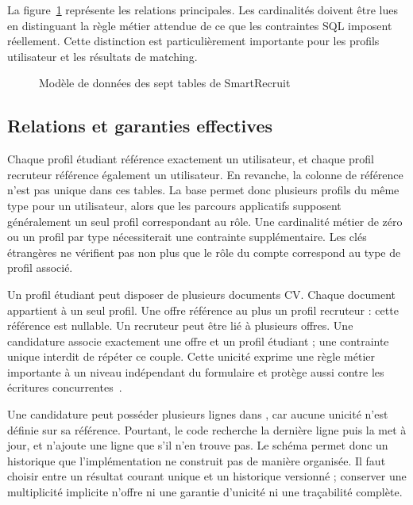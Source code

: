 La figure~\ref{fig:donnees-conception} représente les relations principales. Les cardinalités doivent être lues en distinguant la règle métier attendue de ce que les contraintes SQL imposent réellement. Cette distinction est particulièrement importante pour les profils utilisateur et les résultats de matching.

\begin{figure}[htbp]
\centering

\caption{Modèle de données des sept tables de SmartRecruit}
\label{fig:donnees-conception}
\end{figure}

\subsection{Relations et garanties effectives}

Chaque profil étudiant référence exactement un utilisateur, et chaque profil recruteur référence également un utilisateur. En revanche, la colonne de référence n'est pas unique dans ces tables. La base permet donc plusieurs profils du même type pour un utilisateur, alors que les parcours applicatifs supposent généralement un seul profil correspondant au rôle. Une cardinalité métier de zéro ou un profil par type nécessiterait une contrainte supplémentaire. Les clés étrangères ne vérifient pas non plus que le rôle du compte correspond au type de profil associé.

Un profil étudiant peut disposer de plusieurs documents CV. Chaque document appartient à un seul profil. Une offre référence au plus un profil recruteur : cette référence est nullable. Un recruteur peut être lié à plusieurs offres. Une candidature associe exactement une offre et un profil étudiant ; une contrainte unique interdit de répéter ce couple. Cette unicité exprime une règle métier importante à un niveau indépendant du formulaire et protège aussi contre les écritures concurrentes~\cite{mysql-unique}.

Une candidature peut posséder plusieurs lignes dans , car aucune unicité n'est définie sur sa référence. Pourtant, le code recherche la dernière ligne puis la met à jour, et n'ajoute une ligne que s'il n'en trouve pas. Le schéma permet donc un historique que l'implémentation ne construit pas de manière organisée. Il faut choisir entre un résultat courant unique et un historique versionné ; conserver une multiplicité implicite n'offre ni une garantie d'unicité ni une traçabilité complète.

